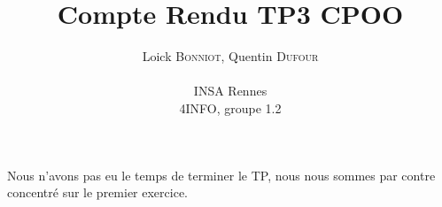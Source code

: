 \documentclass[a4paper,12pt]{article}
\author{
  Loick \textsc{Bonniot}, Quentin \textsc{Dufour} \\ \\
  INSA Rennes \\
  4INFO, groupe 1.2
}
\title{Compte Rendu TP3 CPOO}
\begin{document}
\maketitle

\paragraph{}

Nous n'avons pas eu le temps de terminer le TP, nous nous sommes par contre concentré sur le premier exercice.






\end{document}
